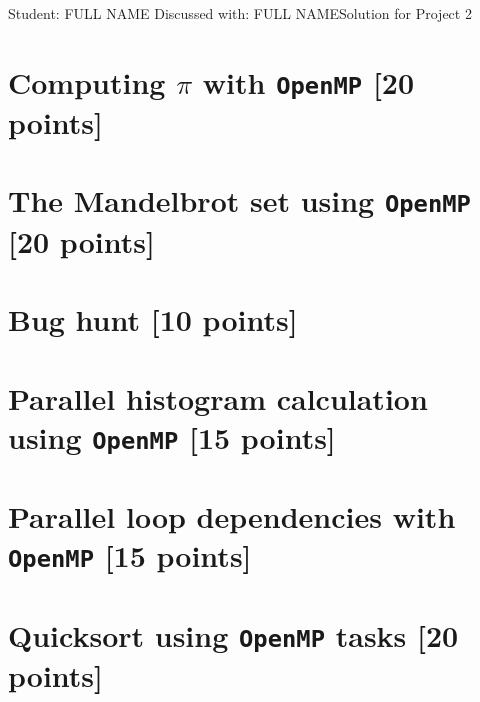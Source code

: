 \documentclass[unicode,11pt,a4paper,oneside,numbers=endperiod,openany]{scrartcl}
\begin{document}
\setassignment
{}

            {Student: FULL NAME}
            {Discussed with: FULL NAME}{Solution for Project 2}{}
\newline

\assignmentpolicy

\section{Computing $\pi$ with \texttt{OpenMP} [20 points]}

\section{The Mandelbrot set  using \texttt{OpenMP} [20 points]}

\section{Bug hunt [10 points]}

\section{Parallel histogram calculation using \texttt{OpenMP} [15 points]}

\section{Parallel loop dependencies with \texttt{OpenMP} [15 points]}

\section{Quicksort using \texttt{OpenMP} tasks [20 points]}
\end{document}
